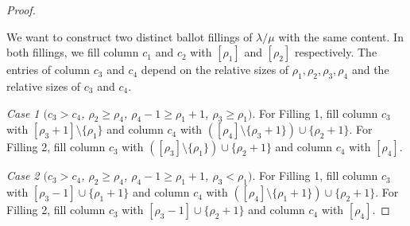 \documentclass[ALCO,ThmDefs,Unicode,epreuves]{cedram}
\let\hypertargeta\hypertarget %
\newenvironment{Case}[1]{\par\vskip2pt\noindent%
\emph{#1}.}{\vskip2pt}
\begin{document}
\begin{proof}
\begin{figure}[htb]
\begin{subfigure}{0.24\textwidth}
 \caption{}
 \end{subfigure}
 \begin{subfigure}{0.24\textwidth}
 \hspace{0.75cm}
 \caption{}
		\label{Figure2d}
 \end{subfigure}
 \caption{}
 \label{only4col} 
\end{figure}

We want to construct two distinct ballot fillings of $\lambda/\mu$ with the same content. In both fillings, we fill column $c_1$ and $c_2$ with $[\rho_1]$ and $[\rho_2]$ respectively. The entries of column $c_3$ and $c_4$ depend on the relative sizes of $\rho_1,\rho_2,\rho_3,\rho_4$ and the relative sizes of $c_3$ and $c_4$.


\begin{Case}
{\hypertargeta{prop3.7case_1}{Case 1} $(c_3 > c_4$, $\rho_2\geq \rho_4$, $\rho_4-1\geq \rho_1+1$, $\rho_3\geq \rho_1)$} 
For Filling 1, fill column $c_3$ with $[\rho_3+1]\setminus \{\rho_1\}$ and column $c_4$ with $([\rho_4]\setminus\{\rho_3+1\})\cup\{\rho_2+1\}$.
For Filling 2, fill column $c_3$ with $([\rho_3]\setminus \{\rho_1\})\cup \{\rho_2+1\}$ and column $c_4$ with $[\rho_4]$.
\end{Case}

\begin{Case}
{\hypertargeta{prop3.7case_2}{Case 2} $(c_3 > c_4$, $\rho_2\geq \rho_4$, $\rho_4-1\geq \rho_1+1$, $\rho_3< \rho_1)$} 
For Filling 1, fill column $c_3$ with $[\rho_3-1]\cup \{\rho_1 + 1\}$ and column $c_4$ with $([\rho_4]\setminus\{\rho_1+1\})\cup\{\rho_2+1\}$.
For Filling 2, fill column $c_3$ with $[\rho_3-1]\cup \{\rho_2+1\}$ and column $c_4$ with $[\rho_4]$.
\end{Case}


\end{proof}
\end{document}

